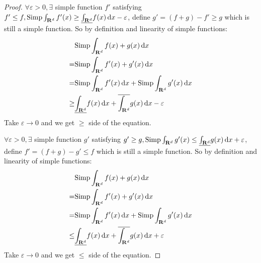 \documentclass{article}
\begin{document}
\begin{proof}
$\forall \varepsilon>0, \exists$ simple function $f'$ satisfying $f'\leq f, \mathrm{Simp}\int_{\mathbf{R}^d}f'(x)\geq \underline{\int_{\mathbf{R}^d}}f(x)\,\mathrm{d} x-\varepsilon$, define $g'=(f+g)-f'\geq g$ which is still a simple function. So by definition and linearity of simple functions:
\[\begin{aligned}
&\mathrm{Simp}\int_{\mathbf{R}^d}f(x)+g(x)\,\mathrm{d} x\\
=&\mathrm{Simp}\int_{\mathbf{R}^d}f'(x)+g'(x)\,\mathrm{d} x\\
=&\mathrm{Simp}\int_{\mathbf{R}^d}f'(x)\,\mathrm{d} x+\mathrm{Simp}\int_{\mathbf{R}^d}g'(x)\,\mathrm{d} x\\
\geq&\underline{\int_{\mathbf{R}^d}}f(x)\,\mathrm{d} x+\overline{\int_{\mathbf{R}^d}}g(x)\,\mathrm{d} x-\varepsilon\\
\end{aligned}\] 
Take $\varepsilon\to 0$ and we get $\geq$ side of the equation.

$\forall \varepsilon>0, \exists$ simple function $g'$ satisfying $g'\geq g, \mathrm{Simp}\int_{\mathbf{R}^d}g'(x)\leq \underline{\int_{\mathbf{R}^d}}g(x)\,\mathrm{d} x+\varepsilon$, define $f'=(f+g)-g'\leq f$ which is still a simple function. So by definition and linearity of simple functions:
\[\begin{aligned}
&\mathrm{Simp}\int_{\mathbf{R}^d}f(x)+g(x)\,\mathrm{d} x\\
=&\mathrm{Simp}\int_{\mathbf{R}^d}f'(x)+g'(x)\,\mathrm{d} x\\
=&\mathrm{Simp}\int_{\mathbf{R}^d}f'(x)\,\mathrm{d} x+\mathrm{Simp}\int_{\mathbf{R}^d}g'(x)\,\mathrm{d} x\\
\leq&\underline{\int_{\mathbf{R}^d}}f(x)\,\mathrm{d} x+\overline{\int_{\mathbf{R}^d}}g(x)\,\mathrm{d} x+\varepsilon\\
\end{aligned}\] 
Take $\varepsilon\to 0$ and we get $\leq$ side of the equation.
\end{proof}
\end{document}
